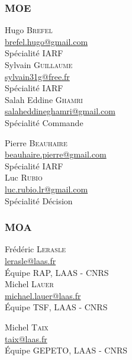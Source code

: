 \documentclass[10pt,a4paper]{article}
\begin{document}
\subsubsection{MOE} 
\begin{minipage}[t]{0.30 \textwidth} 
Hugo \textsc{Brefel} \\
\href{mailto:brefel.hugo@gmail.com}{brefel.hugo@gmail.com} \\
Spécialité IARF \\[0.3cm]
Sylvain \textsc{Guillaume} \\
\href{mailto:sylvain31g@free.fr}{sylvain31g@free.fr} \\
Spécialité IARF \\[0.3cm]
Salah Eddine \textsc{Ghamri} \\
\href{mailto:beauhaire.pierre@gmail.com}{salaheddineghamri@gmail.com} \\
Spécialité Commande
\end{minipage} 
\hfill
\begin{minipage}[t]{0.46\textwidth} 
Pierre \textsc{Beauhaire} \\
\href{mailto:beauhaire.pierre@gmail.com}{beauhaire.pierre@gmail.com} \\
Spécialité IARF \\[0.3cm]
Luc \textsc{Rubio} \\
\href{mailto:luc.rubio.lr@gmail.com}{luc.rubio.lr@gmail.com}   \\
Spécialité Décision
\end{minipage} 

\subsubsection{MOA}
\begin{minipage}[t]{0.46 \textwidth} 
Frédéric \textsc{Lerasle} \\
\href{mailto:lerasle@laas.fr}{lerasle@laas.fr} \\
Équipe RAP, LAAS - CNRS \\[0.3cm]
Michel \textsc{Lauer} \\
\href{mailto:michael.lauer@laas.fr}{michael.lauer@laas.fr} \\
Équipe TSF, LAAS - CNRS
\end{minipage} 
\hfill
\begin{minipage}[t]{0.46\textwidth} 
Michel \textsc{Taix} \\
\href{mailto:taix@laas.fr}{taix@laas.fr} \\
Équipe GEPETO, LAAS - CNRS
\end{minipage} 
\end{document}
